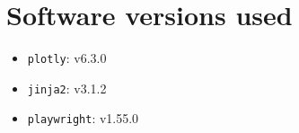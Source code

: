 \section{Software versions used}
\begin{itemize}
    \item \texttt{plotly}: v6.3.0
    \item \texttt{jinja2}: v3.1.2
    \item \texttt{playwright}: v1.55.0
\end{itemize}